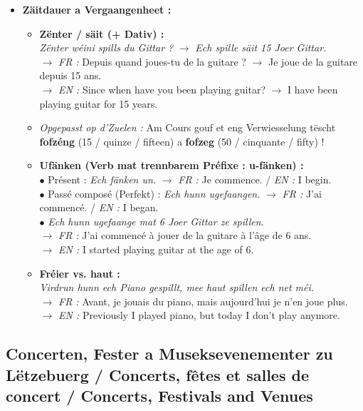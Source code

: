 \begin{itemize}
    \item \textbf{Zäitdauer a Vergaangenheet :}
    \begin{itemize}
        \item \textbf{Zënter / säit (+ Dativ) :} \\
        \textit{Zënter wéini spills du Gittar ?} $\rightarrow$ \textit{Ech spille säit 15 Joer Gittar.} \\
        $\rightarrow$ \textit{FR :} Depuis quand joues-tu de la guitare ? $\rightarrow$ Je joue de la guitare depuis 15 ans. \\
        $\rightarrow$ \textit{EN :} Since when have you been playing guitar? $\rightarrow$ I have been playing guitar for 15 years.
        \item \textit{Opgepasst op d'Zuelen :} Am Cours gouf et eng Verwiesselung tëscht \textbf{fofzéng} (15 / quinze / fifteen) a \textbf{fofzeg} (50 / cinquante / fifty) !
        \item \textbf{Ufänken (Verb mat trennbarem Préfixe : u-fänken) :} \\
        $\bullet$ Présent : \textit{Ech fänken un.} $\rightarrow$ \textit{FR :} Je commence. / \textit{EN :} I begin. \\
        $\bullet$ Passé composé (Perfekt) : \textit{Ech hunn ugefaangen.} $\rightarrow$ \textit{FR :} J'ai commencé. / \textit{EN :} I began. \\
        $\bullet$ \textit{Ech hunn ugefaange mat 6 Joer Gittar ze spillen.} \\
        $\rightarrow$ \textit{FR :} J'ai commencé à jouer de la guitare à l'âge de 6 ans. \\
        $\rightarrow$ \textit{EN :} I started playing guitar at the age of 6.
        \item \textbf{Fréier vs. haut :} \\
        \textit{Virdrun hunn ech Piano gespillt, mee haut spillen ech net méi.} \\
        $\rightarrow$ \textit{FR :} Avant, je jouais du piano, mais aujourd'hui je n'en joue plus. \\
        $\rightarrow$ \textit{EN :} Previously I played piano, but today I don't play anymore.
    \end{itemize}
\end{itemize}

\subsection{Concerten, Fester a Museksevenementer zu Lëtzebuerg / Concerts, fêtes et salles de concert / Concerts, Festivals and Venues}


